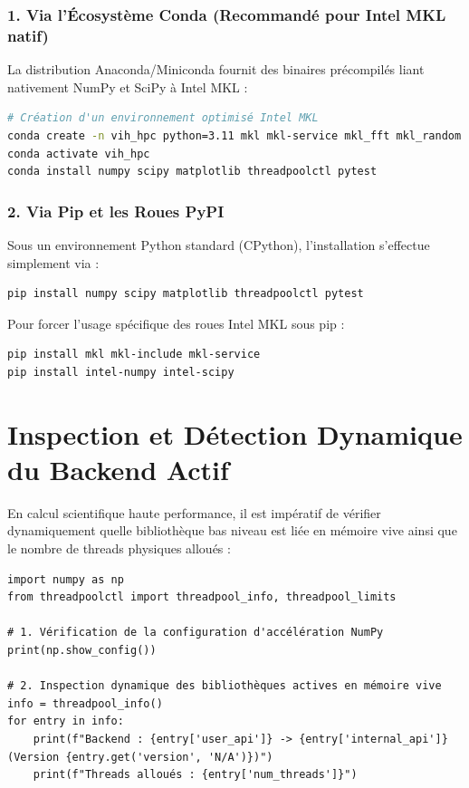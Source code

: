 \documentclass[11pt,a4paper]{report}
\theoremstyle{plain}
\theoremstyle{definition}
\theoremstyle{remark}
\begin{document}
\subsubsection{1. Via l'Écosystème Conda (Recommandé pour Intel MKL natif)}
La distribution Anaconda/Miniconda fournit des binaires précompilés liant nativement NumPy et SciPy à Intel MKL :
\begin{lstlisting}[language=bash]
# Création d'un environnement optimisé Intel MKL
conda create -n vih_hpc python=3.11 mkl mkl-service mkl_fft mkl_random
conda activate vih_hpc
conda install numpy scipy matplotlib threadpoolctl pytest
\end{lstlisting}

\subsubsection{2. Via Pip et les Roues PyPI}
Sous un environnement Python standard (CPython), l'installation s'effectue simplement via :
\begin{lstlisting}[language=bash]
pip install numpy scipy matplotlib threadpoolctl pytest
\end{lstlisting}
Pour forcer l'usage spécifique des roues Intel MKL sous pip :
\begin{lstlisting}[language=bash]
pip install mkl mkl-include mkl-service
pip install intel-numpy intel-scipy
\end{lstlisting}

\section{Inspection et Détection Dynamique du Backend Actif}
En calcul scientifique haute performance, il est impératif de vérifier dynamiquement quelle bibliothèque bas niveau est liée en mémoire vive ainsi que le nombre de threads physiques alloués :

\begin{lstlisting}
import numpy as np
from threadpoolctl import threadpool_info, threadpool_limits

# 1. Vérification de la configuration d'accélération NumPy
print(np.show_config())

# 2. Inspection dynamique des bibliothèques actives en mémoire vive
info = threadpool_info()
for entry in info:
    print(f"Backend : {entry['user_api']} -> {entry['internal_api']} (Version {entry.get('version', 'N/A')})")
    print(f"Threads alloués : {entry['num_threads']}")
\end{lstlisting}
\end{document}
